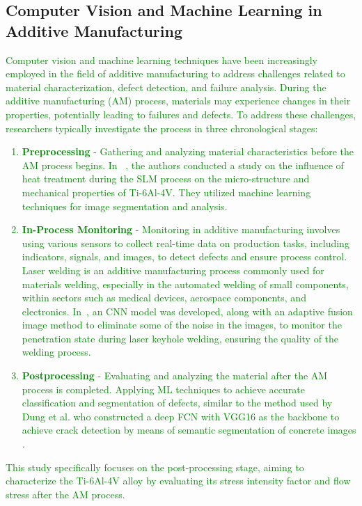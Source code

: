 \documentclass[preprint,12pt]{elsarticle}
\begin{document}
\subsection{Computer Vision and Machine Learning in Additive Manufacturing}
\textcolor{green}{

Computer vision and machine learning techniques have been increasingly employed in the field of additive manufacturing to address challenges related to material characterization, defect detection, and failure analysis. During the additive manufacturing (AM) process, materials may experience changes in their properties, potentially leading to failures and defects. To address these challenges, researchers typically investigate the process in three chronological stages:

\begin{enumerate}
    \item \textbf{Preprocessing} - Gathering and analyzing material characteristics before the AM process begins. In ~\cite{miyazaki2019image}, the authors conducted a study on the influence of heat treatment during the SLM process on the micro-structure and mechanical properties of Ti-6Al-4V. They utilized machine learning techniques for image segmentation and analysis.
    \item \textbf{In-Process Monitoring} - Monitoring in additive manufacturing involves using various sensors to collect real-time data on production tasks, including indicators, signals, and images, to detect defects and ensure process control. Laser welding is an additive manufacturing process commonly used for materials welding, especially in the automated welding of small components, within sectors such as medical devices, aerospace components, and electronics. In~\cite{cai2023real}, an CNN model was developed, along with an adaptive fusion image method to eliminate some of the noise in the images, to monitor the penetration state during laser keyhole welding, ensuring the quality of the welding process.
    \item \textbf{Postprocessing} - Evaluating and analyzing the material after the AM process is completed. Applying ML techniques to achieve accurate classification and segmentation of defects, similar to the method used by Dung et al. who constructed a deep FCN with VGG16 as the backbone to achieve crack detection by means of semantic segmentation of concrete images \cite{pu2022autonomous}.
\end{enumerate}

This study specifically focuses on the post-processing stage, aiming to characterize the Ti-6Al-4V alloy by evaluating its stress intensity factor and flow stress after the AM process.}
\end{document}
